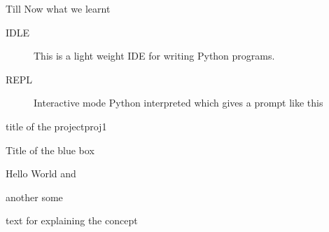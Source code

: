 \documentclass[10pt,a4paper]{memoir}
\begin{document}
Till Now what we learnt 

\begin{summary}
	
	\begin{description}
		\item [IDLE] This is a light weight IDE for writing Python programs. 
		\item [REPL] Interactive mode Python interpreted which gives a prompt like this 
		\item []
	\end{description}
	
	
\end{summary}









\begin{project}{title of the project}{proj1}


\lipsum

\end{project}





\begin{tipbox}
	\lipsum
\end{tipbox}


\begin{mytheorem}{Title of the blue box}
	
	\lipsum
	\lipsum
	
\end{mytheorem}








\begin{concept}[mytitle={Pythagorean Theorem }]
	
	Hello World and 
	
	another some 
	
	text 
	for explaining the concept 
	
	
\end{concept}
\end{document}
